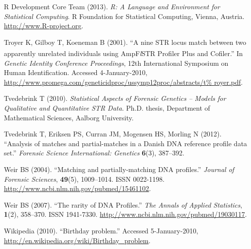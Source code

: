 \documentclass[a4paper,11pt]{article}
\begin{document}
\begin{thebibliography}{}
{R Development Core Team} (2013).
\newblock \emph{R: A Language and Environment for Statistical Computing}.
\newblock R Foundation for Statistical Computing, Vienna, Austria.
\newblock \urlprefix\url{http://www.R-project.org}.

Troyer K, Gilboy T, Koeneman B (2001).
\newblock \enquote{A nine {STR} locus match between two apparently unrelated
  individuals using {A}mp{F}\textit{l}{STR}\textsuperscript{\textregistered}
  {P}rofiler {P}lus\textsuperscript{\texttrademark} and
  {C}ofiler\textsuperscript{\texttrademark}.}
\newblock In \emph{Genetic Identity Conference Proceedings}, 12th International
  Symposium on Human Identification.
\newblock Accessed 4-January-2010,
  \urlprefix\url{http://www.promega.com/geneticidproc/ussymp12proc/abstracts/t%
royer.pdf}.

Tvedebrink T (2010).
\newblock \emph{Statistical Aspects of Forensic Genetics -- Models for
  Qualitative and Quantitative STR Data}.
\newblock Ph.D. thesis, Department of Mathematical Sciences, Aalborg
  University.

Tvedebrink T, Eriksen PS, Curran JM, Mogensen HS, Morling N (2012).
\newblock \enquote{Analysis of matches and partial-matches in a Danish DNA
  reference profile data set.}
\newblock \emph{Forensic Science International: Genetics} \textbf{6}(3), 387--392.

Weir BS (2004).
\newblock \enquote{Matching and partially-matching {DNA} profiles.}
\newblock \emph{Journal of Forensic Sciences}, \textbf{49}(5), 1009--1014.
\newblock ISSN 0022-1198.
\newblock \urlprefix\url{http://www.ncbi.nlm.nih.gov/pubmed/15461102}.

Weir BS (2007).
\newblock \enquote{The rarity of {DNA} Profiles.}
\newblock \emph{The Annals of Applied Statistics}, \textbf{1}(2), 358--370.
\newblock ISSN 1941-7330.
\newblock \urlprefix\url{http://www.ncbi.nlm.nih.gov/pubmed/19030117}.

Wikipedia (2010).
\newblock \enquote{Birthday problem.}
\newblock Accessed 5-January-2010,
  \urlprefix\url{http://en.wikipedia.org/wiki/Birthday_problem}.
\end{thebibliography}
\end{document}
